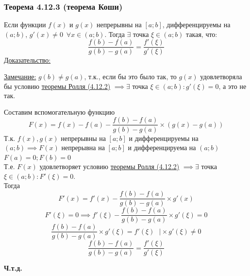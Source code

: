 \documentclass[12pt]{article}
\begin{document}
    \subsubsection*{Теорема 4.12.3 (теорема Коши)}\label{th:4.12.3}
    Если функции $f(x)$ и $g(x)$ непрерывны на $[a;b]$, дифференцируемы на $(a;b)$, $g'(x) \ne 0 \,\,\, \forall x \in (a;b)$. Тогда $\exists$ точка $\xi \in (a;b)$ такая, что:
    \[ \frac{f(b) - f(a)}{g(b) - g(a)} = \frac{f'(\xi)}{g'(\xi)} \]
    \underline{Доказательство:}
    \begin{adjustwidth}{1.5em}{1.5em}
        \underline{Замечание:} $g(b) \ne g(a)$, т.к., если бы это было так, то $g(x)$ удовлетворяла бы условию \hyperref[th:4.12.2]{теоремы Ролля (4.12.2)} $\implies \exists$ точка $\xi \in (a;b) : g'(\xi) = 0$, а это не так.\par\noindent
        Составим вспомогательную функцию
        \[ F(x) = f(x) - f(a) - \frac{f(b) - f(a)}{g(b) - g(a)} \times (g(x) - g(a)) \]
        Т.к. $f(x), g(x)$ непрерывны на $[a;b]$ и дифференцируемы на $(a;b) \implies F(x)$ непрерывна на $[a;b]$ и дифференцируема на $(a;b)$\\
        $F(a) = 0; F(b) = 0$\\
        Т.е. $F(x)$ удовлетворяет условию \hyperref[th:4.12.2]{теоремы Ролля (4.12.2)} $\implies \exists$ точка $\xi \in (a;b) : F'(\xi) = 0$.\\
        Тогда
        \[ F'(x) = f'(x) - \frac{f(b) - f(a)}{g(b) - g(a)} \times g'(x) \]
        \[ F'(\xi) = 0 \implies f'(\xi) - \frac{f(b) - f(a)}{g(b) - g(a)} \times g'(\xi) = 0 \]
        \[ \frac{f(b) - f(a)}{g(b) - g(a)} \times g'(\xi) = f'(\xi) \,\,\,\, \Big| \times g'(\xi) \ne 0 \]
        \[ \frac{f(b) - f(a)}{g(b) - g(a)} = \frac{f'(\xi)}{g'(\xi)} \]
        \begin{center}
            \textbf{Ч.т.д.}
        \end{center}
    \end{adjustwidth}
    
\end{document}
